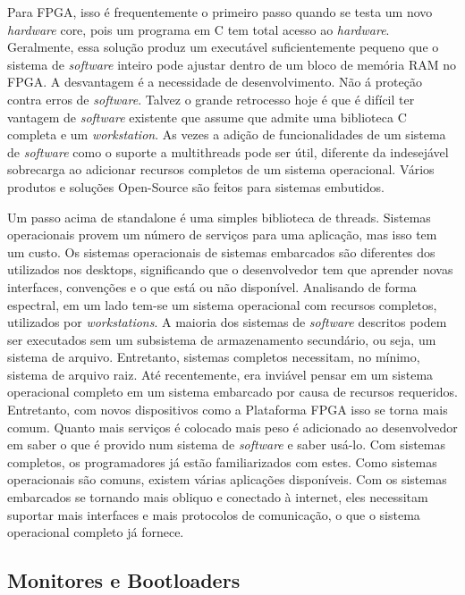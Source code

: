 Para FPGA, isso é frequentemente o primeiro passo quando se testa um novo \textit{hardware} core, pois um programa em C tem total acesso ao \textit{hardware}. Geralmente, essa solução produz um executável suficientemente pequeno que o sistema de \textit{software} inteiro pode ajustar dentro de um bloco de memória RAM no FPGA. A desvantagem é a necessidade de desenvolvimento. Não á proteção contra erros de \textit{software}. Talvez o grande retrocesso hoje é que é difícil ter vantagem de \textit{software} existente que assume que admite uma biblioteca C completa e um \textit{workstation}. As vezes a adição de funcionalidades de um sistema de \textit{software} como o suporte a multithreads pode ser útil, diferente da indesejável sobrecarga ao adicionar recursos completos de um sistema operacional. Vários produtos e soluções Open-Source são feitos para sistemas embutidos.

Um passo acima de standalone é uma simples biblioteca de threads. Sistemas operacionais provem um número de serviços para uma aplicação, mas isso tem um custo. Os sistemas operacionais de sistemas embarcados são diferentes dos utilizados nos desktops, significando que o desenvolvedor tem que aprender novas interfaces, convenções e o que está ou não disponível. Analisando de forma espectral, em um lado tem-se um sistema operacional com recursos completos, utilizados por \textit{\textit{workstation}s}. A maioria dos sistemas de \textit{software} descritos podem ser executados sem um subsistema de armazenamento secundário, ou seja, um sistema de arquivo. Entretanto, sistemas completos necessitam, no mínimo, sistema de arquivo raiz. Até recentemente, era inviável pensar em um sistema operacional completo em um sistema embarcado por causa de recursos requeridos. Entretanto, com novos dispositivos como a Plataforma FPGA isso se torna mais comum. Quanto mais serviços é colocado mais peso é adicionado ao desenvolvedor em saber o que é provido num sistema de \textit{software} e saber usá-lo. Com sistemas completos, os programadores já estão familiarizados com estes. Como sistemas operacionais são comuns, existem várias aplicações disponíveis. Com os sistemas embarcados se tornando mais obliquo e conectado à internet, eles necessitam suportar mais interfaces e mais protocolos de comunicação, o que o sistema operacional completo já fornece.



\subsection{Monitores e Bootloaders}



